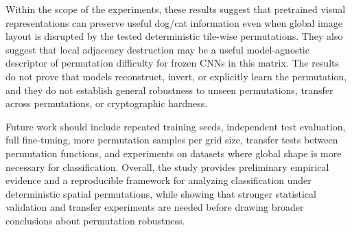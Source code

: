 \documentclass[12pt]{article}
\begin{document}
Within the scope of the experiments, these results suggest that pretrained visual representations can preserve useful dog/cat information even when global image layout is disrupted by the tested deterministic tile-wise permutations. They also suggest that local adjacency destruction may be a useful model-agnostic descriptor of permutation difficulty for frozen CNNs in this matrix. The results do not prove that models reconstruct, invert, or explicitly learn the permutation, and they do not establish general robustness to unseen permutations, transfer across permutations, or cryptographic hardness.

Future work should include repeated training seeds, independent test evaluation, full fine-tuning, more permutation samples per grid size, transfer tests between permutation functions, and experiments on datasets where global shape is more necessary for classification. Overall, the study provides preliminary empirical evidence and a reproducible framework for analyzing classification under deterministic spatial permutations, while showing that stronger statistical validation and transfer experiments are needed before drawing broader conclusions about permutation robustness.
\end{document}
